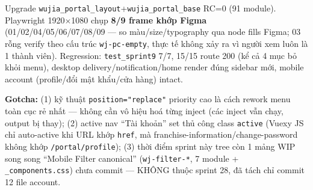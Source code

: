 Upgrade \texttt{wujia\_portal\_layout}+\texttt{wujia\_portal\_base} RC=0 (91 module). Playwright 1920$\times$1080 chụp \textbf{8/9 frame khớp Figma} (01/02/04/05/06/07/08/09 --- so màu/size/typography qua node fills Figma; 03 rỗng verify theo cấu trúc \texttt{wj-pc-empty}, thực tế không xảy ra vì người xem luôn là 1 thành viên). Regression: \texttt{test\_sprint9} 7/7, 15/15 route 200 (kể cả 4 mục bỏ khỏi menu), desktop delivery/notification/home render đúng sidebar mới, mobile account (profile/đổi mật khẩu/cửa hàng) intact.

\textbf{Gotcha:} (1) kỹ thuật \texttt{position="replace"} priority cao là cách rework menu toàn cục rẻ nhất --- không cần vô hiệu hoá từng inject (các inject vẫn chạy, output bị thay); (2) active nav ``Tài khoản'' set thủ công class \texttt{active} (Vuexy JS chỉ auto-active khi URL khớp \texttt{href}, mà franchise-information/change-password không khớp \texttt{/portal/profile}); (3) thời điểm sprint này tree còn 1 mảng WIP song song ``Mobile Filter canonical'' (\texttt{wj-filter-*}, 7 module + \texttt{\_components.css}) chưa commit --- KHÔNG thuộc sprint 28, đã tách chỉ commit 12 file account.
